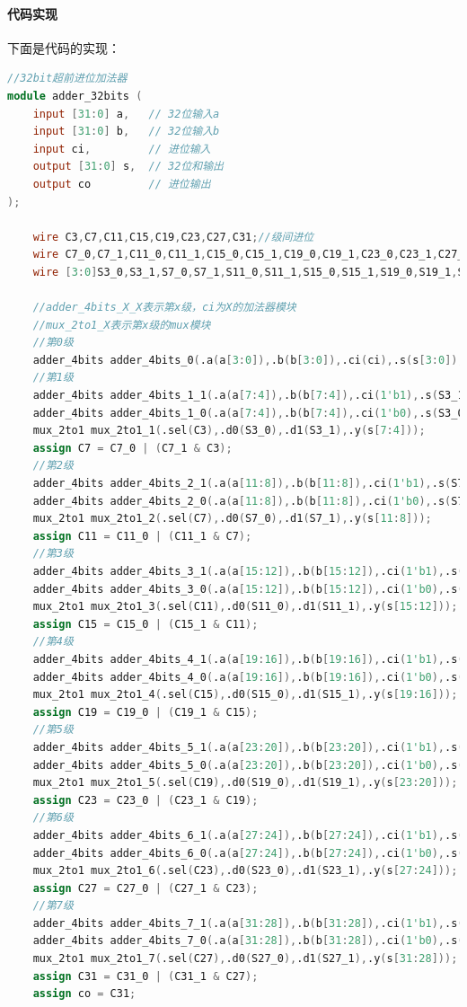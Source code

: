 \documentclass[12pt,hyperref,a4paper,UTF8]{ctexart}
\begin{document}
\paragraph{代码实现}
下面是代码的实现：



\begin{lstlisting}[language=Verilog]
//32bit超前进位加法器
module adder_32bits (
    input [31:0] a,   // 32位输入a
    input [31:0] b,   // 32位输入b
    input ci,         // 进位输入
    output [31:0] s,  // 32位和输出
    output co         // 进位输出
);

    wire C3,C7,C11,C15,C19,C23,C27,C31;//级间进位
    wire C7_0,C7_1,C11_0,C11_1,C15_0,C15_1,C19_0,C19_1,C23_0,C23_1,C27_0,C27_1,C31_0,C31_1;//内部进位
    wire [3:0]S3_0,S3_1,S7_0,S7_1,S11_0,S11_1,S15_0,S15_1,S19_0,S19_1,S23_0,S23_1,S27_0,S27_1,S31_0,S31_1;//内部和

    //adder_4bits_X_X表示第x级，ci为X的加法器模块
    //mux_2to1_X表示第x级的mux模块
    //第0级
    adder_4bits adder_4bits_0(.a(a[3:0]),.b(b[3:0]),.ci(ci),.s(s[3:0]),.co(C3));
    //第1级
    adder_4bits adder_4bits_1_1(.a(a[7:4]),.b(b[7:4]),.ci(1'b1),.s(S3_1),.co(C7_1));
    adder_4bits adder_4bits_1_0(.a(a[7:4]),.b(b[7:4]),.ci(1'b0),.s(S3_0),.co(C7_0));
    mux_2to1 mux_2to1_1(.sel(C3),.d0(S3_0),.d1(S3_1),.y(s[7:4]));
    assign C7 = C7_0 | (C7_1 & C3);
    //第2级
    adder_4bits adder_4bits_2_1(.a(a[11:8]),.b(b[11:8]),.ci(1'b1),.s(S7_1),.co(C11_1));
    adder_4bits adder_4bits_2_0(.a(a[11:8]),.b(b[11:8]),.ci(1'b0),.s(S7_0),.co(C11_0));
    mux_2to1 mux_2to1_2(.sel(C7),.d0(S7_0),.d1(S7_1),.y(s[11:8]));
    assign C11 = C11_0 | (C11_1 & C7);
    //第3级
    adder_4bits adder_4bits_3_1(.a(a[15:12]),.b(b[15:12]),.ci(1'b1),.s(S11_1),.co(C15_1));
    adder_4bits adder_4bits_3_0(.a(a[15:12]),.b(b[15:12]),.ci(1'b0),.s(S11_0),.co(C15_0));
    mux_2to1 mux_2to1_3(.sel(C11),.d0(S11_0),.d1(S11_1),.y(s[15:12]));
    assign C15 = C15_0 | (C15_1 & C11);
    //第4级
    adder_4bits adder_4bits_4_1(.a(a[19:16]),.b(b[19:16]),.ci(1'b1),.s(S15_1),.co(C19_1));
    adder_4bits adder_4bits_4_0(.a(a[19:16]),.b(b[19:16]),.ci(1'b0),.s(S15_0),.co(C19_0));
    mux_2to1 mux_2to1_4(.sel(C15),.d0(S15_0),.d1(S15_1),.y(s[19:16]));
    assign C19 = C19_0 | (C19_1 & C15);
    //第5级
    adder_4bits adder_4bits_5_1(.a(a[23:20]),.b(b[23:20]),.ci(1'b1),.s(S19_1),.co(C23_1));
    adder_4bits adder_4bits_5_0(.a(a[23:20]),.b(b[23:20]),.ci(1'b0),.s(S19_0),.co(C23_0));
    mux_2to1 mux_2to1_5(.sel(C19),.d0(S19_0),.d1(S19_1),.y(s[23:20]));
    assign C23 = C23_0 | (C23_1 & C19);
    //第6级
    adder_4bits adder_4bits_6_1(.a(a[27:24]),.b(b[27:24]),.ci(1'b1),.s(S23_1),.co(C27_1));
    adder_4bits adder_4bits_6_0(.a(a[27:24]),.b(b[27:24]),.ci(1'b0),.s(S23_0),.co(C27_0));
    mux_2to1 mux_2to1_6(.sel(C23),.d0(S23_0),.d1(S23_1),.y(s[27:24]));
    assign C27 = C27_0 | (C27_1 & C23);
    //第7级
    adder_4bits adder_4bits_7_1(.a(a[31:28]),.b(b[31:28]),.ci(1'b1),.s(S27_1),.co(C31_1));
    adder_4bits adder_4bits_7_0(.a(a[31:28]),.b(b[31:28]),.ci(1'b0),.s(S27_0),.co(C31_0));
    mux_2to1 mux_2to1_7(.sel(C27),.d0(S27_0),.d1(S27_1),.y(s[31:28]));
    assign C31 = C31_0 | (C31_1 & C27);
    assign co = C31;




\end{lstlisting}
\end{document}
